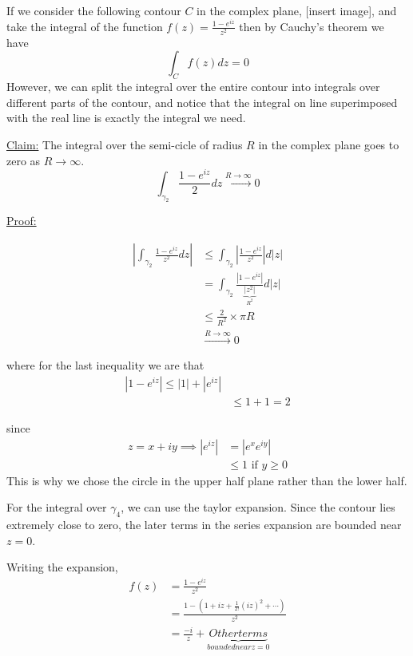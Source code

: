 \documentclass{article}
\begin{document}
If we consider the following contour $C$ in the complex plane, [insert image], and take the integral of the function $f(z) = \frac{1-e^{iz}}{z^2}$ then by Cauchy's theorem we have 
\[ \int_C f(z) dz = 0 \]
However, we can split the integral over the entire contour into integrals over different parts of the contour, and notice that the integral on line superimposed with the real line is exactly the integral we need.

\vskip 0.5cm
\underline{Claim:} The integral over the semi-cicle of radius $R$ in the complex plane goes to zero as $R \rightarrow \infty$.
\[ \int_{\gamma_2}  \frac{1-e^{iz}}{2} dz \xrightarrow{R \rightarrow \infty} 0\]

\vskip 0.25cm
\underline{Proof:}

\begin{align*}
  \left| \int_{\gamma_2}  \frac{1-e^{iz}}{z^2} dz \right| &\leq \int_{\gamma_2}  \left|\frac{1-e^{iz}}{z^2}\right| d\left|z\right| \\
  &=\int_{\gamma_2} \frac{\left|1-e^{iz}\right|}{\underbrace{\left|z^2\right|}_{R^2}} d\left|z\right| \\
  &\leq \frac{2}{R^2} \times \pi R \\
  &\xrightarrow{R \rightarrow \infty} 0
\end{align*}

where for the last inequality we are that 
\begin{align*}
  \left| 1 - e^{iz} \right| \leq \left|1\right| + \left|e^{iz}\right| \\
  &\leq 1 + 1 = 2
\end{align*}

since 
\begin{align*}
  z = x + iy \implies \left|e^{iz}\right| &= \left|e^{x} e^{iy}\right|\\
  &\leq 1 \text{ if } y \geq 0
\end{align*}
This is why we chose the circle in the upper half plane rather than the lower half.


For the integral over $\gamma_4$, we can use the taylor expansion. Since the contour lies extremely close to zero, the later terms in the series expansion are bounded near $z = 0$.

Writing the expansion,
\begin{align*}
  f(z) &= \frac{1 - e^{iz}}{z^2} \\
  &= \frac{1 - (1 + iz + \frac{1}{2!}(iz)^2 + \cdots )}{z^2} \\
  &= \frac{-i}{z} + \underbrace{Other terms}_{bounded near z = 0}
\end{align*}
\end{document}
